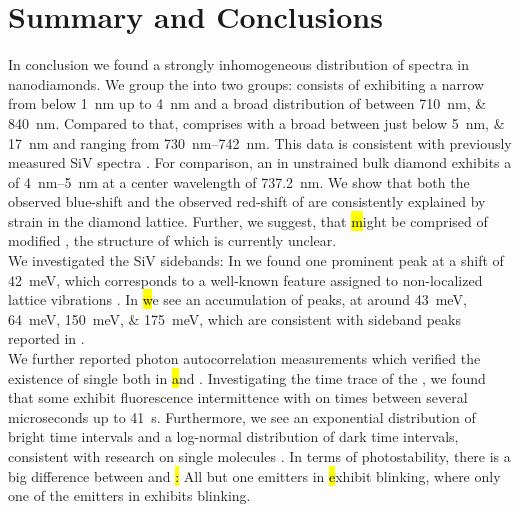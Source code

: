 

 \chapter*{Summary and Conclusions}	\label{ch::conclusion}


   In conclusion we found a strongly inhomogeneous distribution of \siv spectra in nanodiamonds.
   We group the \zpls into two groups:
   \Hl consists of \ZPLs exhibiting a narrow \lw from below \SI{1}{nm} up to \SI{4}{nm} and a broad distribution of \cwl between \SIlist{710;840}{nm}.
   Compared to that, \vl comprises \ZPLs with a broad \lw between just below \SIlist{5; 17}{nm} and \cwl ranging from \SIrange{730}{742}{nm}.
   This data is consistent with previously measured SiV spectra \cite{Benedikter2017a,Neu2012}.
   For comparison, an \siv in unstrained bulk diamond exhibits a \lw of \SIrange{4}{5}{nm} at a center wavelength of \SI{737.2}{nm}\cite{Arend2016a,Dietrich2014}.
   We show that both the observed blue-shift and the observed red-shift of \vl are consistently explained by strain in the diamond lattice.
   Further, we suggest, that \hl might be comprised of modified \sivs, the structure of which is currently unclear.
   \\
   We investigated the SiV sidebands:
   In \vl we found one prominent peak at a shift of \SI{42}{meV}, which corresponds to a well-known feature assigned to non-localized lattice vibrations \cite{Larkins1971,Sternschulte1994}.
   In \hl we see an accumulation of peaks, at around \SIlist{43;64;150;175}{meV}, which are consistent with sideband peaks reported in \cite{Sternschulte1994,Zaitsev2001,Neu2011}.
   \\
   We further reported photon autocorrelation measurements which verified the existence of single \sivs both in \hl and \vl.
   Investigating the time trace of the \siv \pl, we found that some \sivs exhibit fluorescence intermittence with on times between several microseconds up to \SI{41}{s}.
   Furthermore, we see an exponential distribution of bright time intervals and a log-normal distribution of dark time intervals, consistent with research on single molecules \cite{Wong2013}.
   In terms of photostability, there is a big difference between \vl and \hl:
   All but one emitters in \hl exhibit blinking, where only one of the emitters in \vl exhibits blinking.


